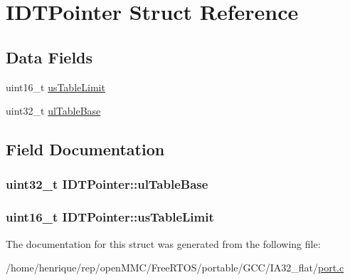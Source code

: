 \hypertarget{structIDTPointer}{\section{I\-D\-T\-Pointer Struct Reference}
\label{structIDTPointer}
}
\subsection*{Data Fields}
\begin{DoxyCompactItemize}
\item 
uint16\-\_\-t \hyperlink{structIDTPointer_aeefac984912934d0f1ad135644e48c2a}{us\-Table\-Limit}
\item 
uint32\-\_\-t \hyperlink{structIDTPointer_a014cc57a08ff43c0b9adc89bfaa1a313}{ul\-Table\-Base}
\end{DoxyCompactItemize}


\subsection{Field Documentation}
\hypertarget{structIDTPointer_a014cc57a08ff43c0b9adc89bfaa1a313}{
\subsubsection[{ul\-Table\-Base}]{\setlength{\rightskip}{0pt plus 5cm}uint32\-\_\-t I\-D\-T\-Pointer\-::ul\-Table\-Base}}\label{structIDTPointer_a014cc57a08ff43c0b9adc89bfaa1a313}
\hypertarget{structIDTPointer_aeefac984912934d0f1ad135644e48c2a}{
\subsubsection[{us\-Table\-Limit}]{\setlength{\rightskip}{0pt plus 5cm}uint16\-\_\-t I\-D\-T\-Pointer\-::us\-Table\-Limit}}\label{structIDTPointer_aeefac984912934d0f1ad135644e48c2a}


The documentation for this struct was generated from the following file\-:\begin{DoxyCompactItemize}
\item 
/home/henrique/rep/open\-M\-M\-C/\-Free\-R\-T\-O\-S/portable/\-G\-C\-C/\-I\-A32\-\_\-flat/\hyperlink{GCC_2IA32__flat_2port_8c}{port.\-c}\end{DoxyCompactItemize}
